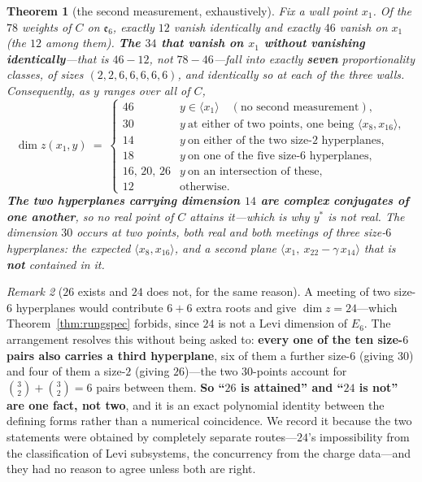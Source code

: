 \documentclass[11pt,reqno]{amsart}
\theoremstyle{plain}
\newtheorem{theorem}{Theorem}[section]
\theoremstyle{definition}
\theoremstyle{remark}
\newtheorem{remark}[theorem]{Remark}
\newcommand{\ee}{\mathfrak{e}}
\begin{document}
\begin{theorem}[the second measurement, exhaustively]\label{thm:smtfull}
Fix a wall point $x_1$. Of the $78$ weights of $C$ on $\ee_6$, exactly $12$ vanish
identically and exactly $46$ vanish on $x_1$ (the $12$ among them). \textbf{The $34$
that vanish on $x_1$ without vanishing identically}---that is $46-12$, not
$78-46$---fall into exactly \textbf{seven}
proportionality classes, of sizes $(2,2,6,6,6,6,6)$, and identically so at each of the
three walls. Consequently, as $y$ ranges over \emph{all} of $C$,
\[
  \dim z(x_1,y)\ =\
  \begin{cases}
    46 & y\in\langle x_1\rangle\quad(\text{no second measurement}),\\
    30 & y\ \text{at either of two points, one being }\langle x_8,x_{16}\rangle,\\
    14 & y\ \text{on either of the two size-$2$ hyperplanes},\\
    18 & y\ \text{on one of the five size-$6$ hyperplanes},\\
    16,\,20,\,26 & y\ \text{on an intersection of these},\\
    12 & \text{otherwise.}
  \end{cases}
\]
\textbf{The two hyperplanes carrying dimension $14$ are complex conjugates of one
another}, so no real point of $C$ attains it---which is why $y^*$ is not real. The
dimension $30$ occurs at \emph{two} points, both real and both meetings of three
size-$6$ hyperplanes: the expected $\langle x_8,x_{16}\rangle$, and a second plane
$\langle x_1,\ x_{22}-\gamma\,x_{14}\rangle$ that is \textbf{not} contained in it.
\end{theorem}

\begin{remark}[$26$ exists and $24$ does not, for the same reason]\label{rem:2426}
A meeting of two size-$6$ hyperplanes would contribute $6+6$ extra roots and give
$\dim z=24$---which Theorem~\ref{thm:rungspec} forbids, since $24$ is not a Levi
dimension of $E_6$. The arrangement resolves this without being asked to:
\textbf{every one of the ten size-$6$ pairs also carries a third hyperplane}, six of
them a further size-$6$ (giving $30$) and four of them a size-$2$ (giving $26$)---the
two $30$-points account for $\binom{3}{2}+\binom{3}{2}=6$ pairs between them.
\textbf{So ``$26$ is attained'' and ``$24$ is not'' are one fact, not two}, and it is an
exact polynomial identity between the defining forms rather than a numerical
coincidence. We record it because the two statements were obtained by completely
separate routes---$24$'s impossibility from the classification of Levi subsystems, the
concurrency from the charge data---and they had no reason to agree unless both are
right.
\end{remark}
\end{document}
